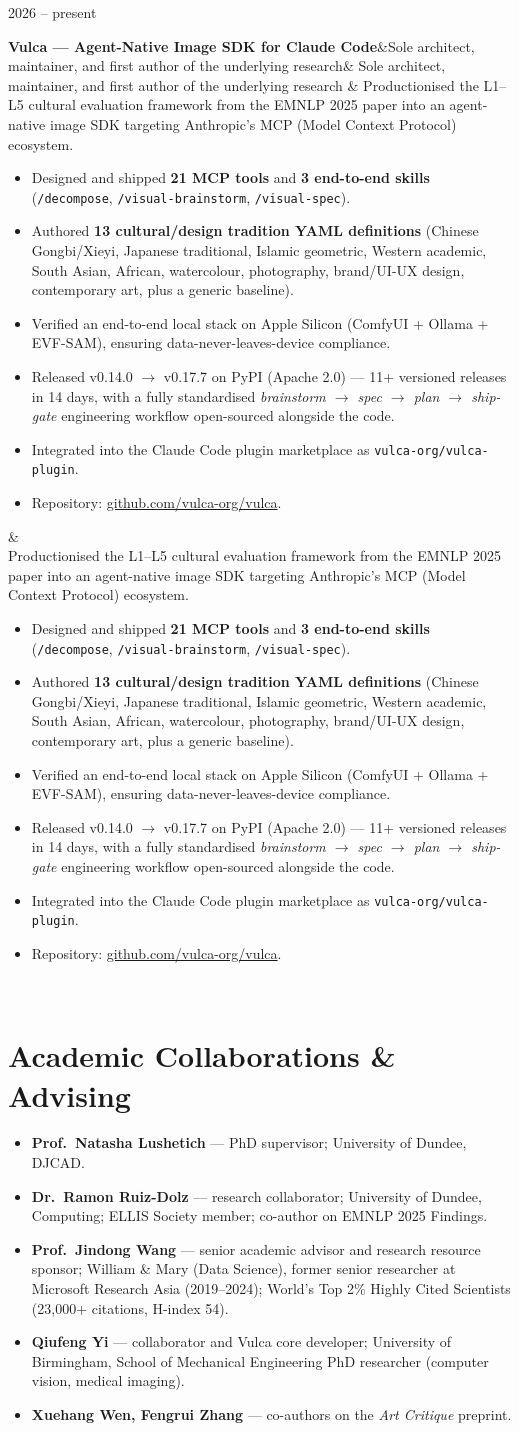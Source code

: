 \documentclass[10.5pt,a4paper]{article}
\newcommand{\cventry}[4]{%
  \noindent\begin{minipage}[t]{0.18\linewidth}\color{muted}\small #1\end{minipage}%
  \begin{minipage}[t]{0.80\linewidth}%
    \textbf{#2}\ifx&#3&\else{} \textperiodcentered{} {\color{muted}#3}\fi%
    \ifx&#4&\else\\[2pt]\small #4\fi%
  \end{minipage}\\[6pt]%
}
\begin{document}
\cventry{2026 – present}
  {Vulca — Agent-Native Image SDK for Claude Code}
  {Sole architect, maintainer, and first author of the underlying research}
  {%
  Productionised the L1–L5 cultural evaluation framework from the EMNLP 2025 paper into
  an agent-native image SDK targeting Anthropic's MCP (Model Context Protocol) ecosystem.
  \begin{itemize}
    \item Designed and shipped \textbf{21 MCP tools} and \textbf{3 end-to-end skills}
    (\texttt{/decompose}, \texttt{/visual-brainstorm}, \texttt{/visual-spec}).
    \item Authored \textbf{13 cultural/design tradition YAML definitions}
    (Chinese Gongbi/Xieyi, Japanese traditional, Islamic geometric, Western academic,
    South Asian, African, watercolour, photography, brand/UI-UX design, contemporary art,
    plus a generic baseline).
    \item Verified an end-to-end local stack on Apple Silicon (ComfyUI + Ollama + EVF-SAM),
    ensuring data-never-leaves-device compliance.
    \item Released v0.14.0 $\to$ v0.17.7 on PyPI (Apache 2.0) — 11+ versioned releases in 14 days,
    with a fully standardised \emph{brainstorm $\to$ spec $\to$ plan $\to$ ship-gate} engineering workflow
    open-sourced alongside the code.
    \item Integrated into the Claude Code plugin marketplace as \texttt{vulca-org/vulca-plugin}.
    \item Repository: \href{https://github.com/vulca-org/vulca}{github.com/vulca-org/vulca}.
  \end{itemize}}

\section*{Academic Collaborations \& Advising}

\begin{itemize}
  \item \textbf{Prof.~Natasha Lushetich} — PhD supervisor; University of Dundee, DJCAD.
  \item \textbf{Dr.~Ramon Ruiz-Dolz} — research collaborator; University of Dundee, Computing;
  ELLIS Society member; co-author on EMNLP 2025 Findings.
  \item \textbf{Prof.~Jindong Wang} — senior academic advisor and research resource sponsor;
  William \& Mary (Data Science), former senior researcher at Microsoft Research Asia (2019–2024);
  World's Top 2\% Highly Cited Scientists (23{,}000+ citations, H-index 54).
  \item \textbf{Qiufeng Yi} — collaborator and Vulca core developer;
  University of Birmingham, School of Mechanical Engineering PhD researcher (computer vision, medical imaging).
  \item \textbf{Xuehang Wen, Fengrui Zhang} — co-authors on the \emph{Art Critique} preprint.
\end{itemize}
\end{document}

